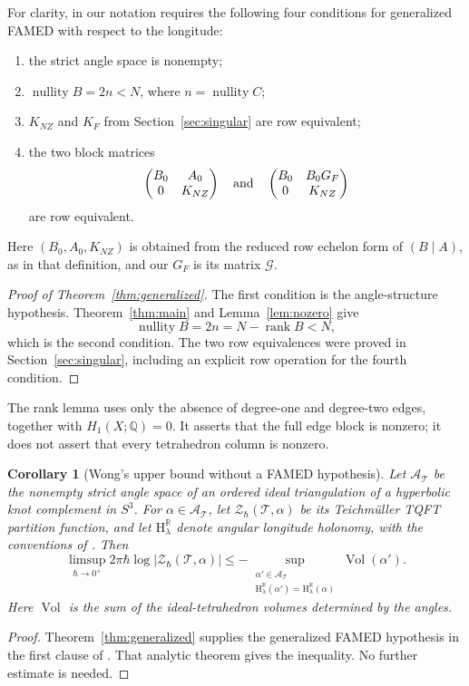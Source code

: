 \documentclass[11pt]{article}
\newtheorem{corollary}[theorem]{Corollary}
\theoremstyle{definition}\newtheorem{definition}[theorem]{Definition}
\theoremstyle{remark}\newtheorem{remark}[theorem]{Remark}
\DeclareMathOperator{\rank}{rank}
\DeclareMathOperator{\nullity}{nullity}
\newcommand{\R}{\mathbb R}
\newcommand{\Q}{\mathbb Q}
\begin{document}
For clarity, in our notation \cite[Definition~1.1]{Wong} requires
the following four conditions for generalized FAMED with respect
to the longitude:
\begin{enumerate}
\item the strict angle space is nonempty;
\item $\nullity B=2n<N$, where $n=\nullity C$;
\item $K_{NZ}$ and $K_F$ from Section~\ref{sec:singular} are row equivalent;
\item the two block matrices
\[
\begin{pmatrix}B_0&A_0\\0&K_{NZ}\end{pmatrix}
\quad\hbox{and}\quad
\begin{pmatrix}B_0&B_0G_F\\0&K_{NZ}\end{pmatrix}
\]
are row equivalent.
\end{enumerate}
Here $(B_0,A_0,K_{NZ})$ is obtained from the reduced row echelon
form of $(B\mid A)$, as in that definition, and our $G_F$ is its
matrix $\mathscr G$.

\begin{proof}[Proof of Theorem~\ref{thm:generalized}]
The first condition is the angle-structure hypothesis.
Theorem~\ref{thm:main} and Lemma~\ref{lem:nozero} give
\[\nullity B=2n=N-\rank B<N,\]
which is the second condition. The two row equivalences were proved
in Section~\ref{sec:singular}, including an explicit row operation
for the fourth condition.
\end{proof}

The rank lemma uses only the absence of degree-one and degree-two
edges, together with $H_1(X;\Q)=0$. It asserts that the full edge
block is nonzero; it does not assert that every tetrahedron column
is nonzero.

\begin{corollary}[Wong's upper bound without a FAMED hypothesis]\label{cor:upperbound}
Let $\mathscr A_{\mathcal T}$ be the nonempty strict angle space of
an ordered ideal triangulation of a hyperbolic knot complement in
$S^3$. For $\alpha\in\mathscr A_{\mathcal T}$, let
$\mathscr Z_\hbar(\mathcal T,\alpha)$ be its Teichm\"uller TQFT
partition function, and let $\mathrm H_\lambda^{\R}$ denote angular
longitude holonomy, with the conventions of \cite{Wong}. Then
\[
\limsup_{\hbar\to0^+}2\pi\hbar\log|\mathscr Z_\hbar(\mathcal T,\alpha)|
\leq-\sup_{\substack{\alpha'\in\mathscr A_{\mathcal T}\\
\mathrm H_\lambda^{\R}(\alpha')=\mathrm H_\lambda^{\R}(\alpha)}}
\operatorname{Vol}(\alpha').
\]
Here $\operatorname{Vol}$ is the sum of the ideal-tetrahedron volumes
determined by the angles.
\end{corollary}
\begin{proof}
Theorem~\ref{thm:generalized} supplies the generalized FAMED
hypothesis in the first clause of \cite[Theorem~1.11]{Wong}. That
analytic theorem gives the inequality. No further estimate is needed.
\end{proof}
\end{document}
